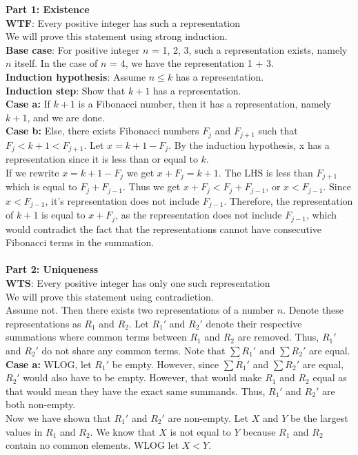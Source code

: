\documentclass[12pt]{article}
\begin{document}
\textbf{Part 1: Existence}\\
\textbf{WTF}: Every positive integer has such a representation \\
We will prove this statement using strong induction.\\
\textbf{Base case}: For positive integer $n$ = 1, 2, 3, such a representation exists, namely $n$ itself. In the case of $n$ = 4, we have the representation 1 + 3. \\
\textbf{Induction hypothesis}: Assume $n \leq k$ has a representation. \\
\textbf{Induction step}: Show that $k+1$ has a representation. \\
\textbf{Case a:} If $k+1$ is a Fibonacci number, then it has a representation, namely $k+1$, and we are done. \\
\textbf{Case b:} Else, there exists Fibonacci numbers $F_{j}$ and $F_{j+1}$ such that $F_{j} < k+1 < F_{j+1}$. Let $x = k+1 - F_{j}$. By the induction hypothesis, x has a representation since it is less than or equal to $k$.\\
If we rewrite $x = k+1 - F_{j}$ we get $x + F_{j} = k+1$. The LHS is less than $F_{j+1}$ which is equal to $F_{j} + F_{j-1}$. Thus we get $x + F_{j} < F_{j} + F_{j-1}$, or $x < F_{j-1}$. Since $x < F_{j-1}$, it's representation does not include $F_{j-1}$. Therefore, the representation of $k+1$ is equal to $x + F_{j}$, as the representation does not include $F_{j-1}$, which would contradict the fact that the representations cannot have consecutive Fibonacci terms in the summation.
\\\\
\textbf{Part 2: Uniqueness}\\
\textbf{WTS}: Every positive integer has only one such representation \\
We will prove this statement using contradiction. \\
Assume not. Then there exists two representations of a number $n$. Denote these representations as $R_{1}$ and $R_{2}$. Let $R_{1}'$ and $R_{2}'$ denote their respective summations where common terms between $R_{1}$ and $R_{2}$ are removed. Thus, $R_{1}'$ and $R_{2}'$ do not share any common terms. Note that $\sum {R_{1}'}$ and $\sum {R_{2}'}$ are equal. \\
\textbf{Case a:} WLOG, let $R_{1}'$ be empty. However, since $\sum {R_{1}'}$ and $\sum {R_{2}'}$ are equal, $R_{2}'$ would also have to be empty. However, that would make $R_{1}$ and $R_{2}$ equal as that would mean they have the exact same summands. Thus, $R_{1}'$ and $R_{2}'$ are both non-empty.\\
Now we have shown that $R_{1}'$ and $R_{2}'$ are non-empty. Let $X$ and $Y$ be the largest values in $R_{1}$ and $R_{2}$. We know that $X$ is not equal to $Y$ because $R_{1}$ and $R_{2}$ contain no common elements. WLOG let $X < Y$.
\\\\
\end{document}
